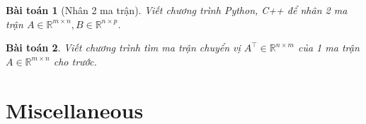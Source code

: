 \documentclass{article}
\newtheorem{baitoan}{Bài toán}
\begin{document}
\begin{baitoan}[Nhân 2 ma trận]
    Viết chương trình {\sf Python, C++} để nhân 2 ma trận $A\in\mathbb{R}^{m\times n},B\in\mathbb{R}^{n\times p}$.
\end{baitoan}

\begin{baitoan}
    Viết chương trình tìm ma trận chuyển vị $A^\top\in\mathbb{R}^{n\times m}$ của 1 ma trận $A\in\mathbb{R}^{m\times n}$ cho trước.
\end{baitoan}


\section{Miscellaneous}


\printbibliography[heading=bibintoc]
\end{document}
